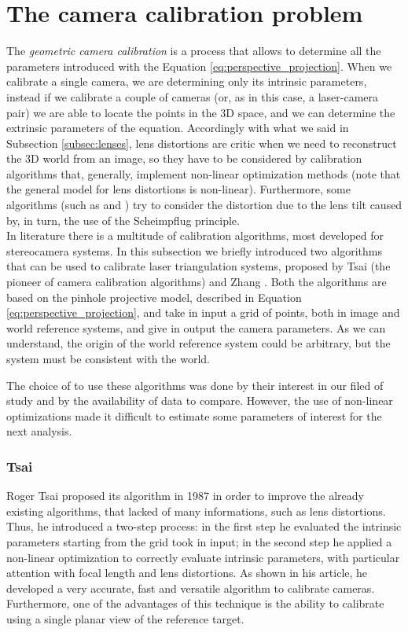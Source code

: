 \section{The camera calibration problem}
\label{sec:teo-calibration}
The \textit{geometric camera calibration} is a process that allows to determine all the parameters introduced with the Equation \ref{eq:perspective_projection}. When we calibrate a single camera, we are determining only its intrinsic parameters, instead if we calibrate a couple of cameras (or, as in this case, a laser-camera pair) we are able to locate the points in the 3D space, and we can determine the extrinsic parameters of the equation. Accordingly with what we said in Subsection \ref{subsec:lenses}, lens distortions are critic when we need to reconstruct the 3D world from an image, so they have to be considered by calibration algorithms that, generally, implement non-linear optimization methods (note that the general model for lens distortions is non-linear). Furthermore, some algorithms (such as \cite{SchCameraCalib} and \cite{hamrouni2012new}) try to consider the distortion due to the lens tilt caused by, in turn, the use of the Scheimpflug principle. \\

In literature there is a multitude of calibration algorithms, most developed for stereocamera systems. In this subsection we briefly introduced two algorithms that can be used to calibrate laser triangulation systems, proposed by Tsai \cite{TsaiTvLenses} (the pioneer of camera calibration algorithms) and Zhang \cite{Zhang-calib}. Both the algorithms are based on the pinhole projective model, described in Equation \ref{eq:perspective_projection}, and take in input a grid of points, both in image and world reference systems, and give in output the camera parameters. As we can understand, the origin of the world reference system could be arbitrary, but the system must be consistent with the world.

The choice of to use these algorithms was done by their interest in our filed of study and by the availability of data to compare. However, the use of non-linear optimizations made it difficult to estimate some parameters of interest for the next analysis.

\subsubsection{Tsai}
Roger Tsai proposed its algorithm in 1987 in order to improve the already existing algorithms, that lacked of many informations, such as lens distortions. Thus, he introduced a two-step process: in the first step he evaluated the intrinsic parameters starting from the grid took in input; in the second step he applied a non-linear optimization to correctly evaluate intrinsic parameters, with particular attention with focal length and lens distortions. As shown in his article, he developed a very accurate, fast and versatile algorithm to calibrate cameras. Furthermore, one of the advantages of this technique is the ability to calibrate using a single planar view of the reference target. \\

